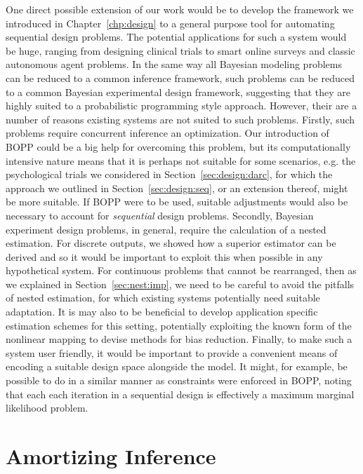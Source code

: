 One direct possible extension of our work would be to develop the framework we introduced 
in Chapter~\ref{chp:design} to a general purpose tool for automating sequential design problems.
The potential applications for such a system would be huge,  ranging from designing clinical trials to
smart online surveys and classic autonomous agent problems.  In  the same way all Bayesian modeling
problems can be reduced to a common inference framework, such problems can be reduced to a
common Bayesian experimental design framework, suggesting that they are highly suited to a
probabilistic programming style approach.  However, their are a number of reasons existing systems
are not suited to such problems.  Firstly, such problems require concurrent inference 
an optimization.  Our introduction of BOPP could be a big help for overcoming this problem,
but its computationally intensive nature means that it is perhaps not suitable for
some scenarios, e.g. the psychological trials we considered in Section~\ref{sec:design:darc},
for which the approach we outlined in Section~\ref{sec:design:seq}, or an extension thereof,
might be more suitable.  If BOPP were to be used, suitable adjustments would also be necessary
to account for \emph{sequential} design problems.
Secondly, Bayesian experiment design problems, in general, require the calculation of a nested 
estimation.  For discrete outputs, we showed how a superior estimator can be derived and so
it would be important to exploit this when possible in any hypothetical system.  For continuous problems that
cannot be rearranged, then as we explained in Section~\ref{sec:nest:imp}, we need to be careful
to avoid the pitfalls of nested estimation, for which existing systems potentially need suitable
adaptation.  It is may also to be beneficial to develop application specific estimation schemes
for this setting, potentially exploiting the known form of the nonlinear mapping to
devise methods for bias reduction.  Finally, to make such a system user friendly, it would
be important to provide a convenient means of encoding a suitable design space alongside the
model.  It might, for example, be possible to do in a similar manner as constraints were enforced
in BOPP, noting that each each iteration in a sequential design is effectively a maximum marginal likelihood
problem.

\section{Amortizing Inference}

